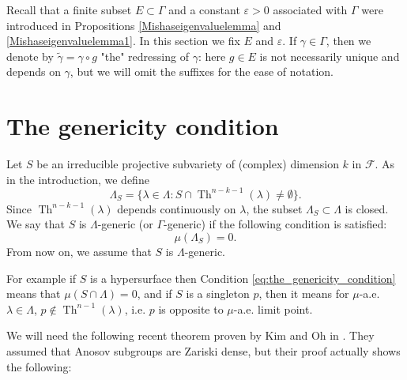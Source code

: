 \documentclass[12pt]{amsbook}%
\theoremstyle{definition}
\theoremstyle{remark}
\numberwithin{section}{chapter}
\numberwithin{subsection}{section}
\numberwithin{figure}{chapter}
\DeclareMathOperator{\Th}{Th}
\def\cF{{\mathscr{F}}}
\def\Ga{\Gamma}
\def\La{\Lambda}
\def\la{\lambda}
\begin{document}
{{Recall that a finite subset $E\subset \Ga$ and a constant $\varepsilon> 0$ associated with $\Gamma$ were introduced in Propositions \ref{Mishaseigenvaluelemma} and \ref{Mishaseigenvaluelemma1}. In this section 
we fix $E$ and $\varepsilon$. If $\gamma\in \Gamma$, then we denote by $\tilde{\gamma}=\gamma\circ g$ "the" redressing of $\gamma$: here $g\in E$ is not necessarily unique and depends on $\gamma$, but we will omit the suffixes for the ease of notation.

\section{The genericity condition}\label{sec:genericity}



Let $S$ be an irreducible projective subvariety of (complex) dimension $k$ in $\cF$. As in the introduction, we define \index{$\La_S$}
$$
\La_S=\{\la\in \La: S\cap \Th^{n-k-1}(\la)\ne \emptyset \}.
$$
Since $\Th^{n-k-1}(\la)$ depends continuously on $\la$, the subset $\La_S\subset \La$ is closed. We say that $S$ is $\Lambda$-generic (or $\Gamma$-generic) if the following condition is satisfied:
\begin{equation}
\label{eq:the_genericity_condition}
\mu(\La_S)=0.
\end{equation}
From now on, we assume that $S$ is $\Lambda$-generic. 


	
For example if $S$ is a hypersurface then Condition \eqref{eq:the_genericity_condition} means that $\mu(S\cap \Lambda)=0$, and if $S$ is a singleton $p$, then it means 
for $\mu$-a.e. $\la\in \La$,  $p\notin \Th^{n-1}(\la)$, i.e. $p$  is opposite to $\mu$-a.e.  limit point.





We will need the following recent theorem proven by Kim and Oh in  \cite{Kim-Oh}. They assumed that Anosov subgroups are Zariski dense, but their proof actually shows the following: 

}}
\end{document}

